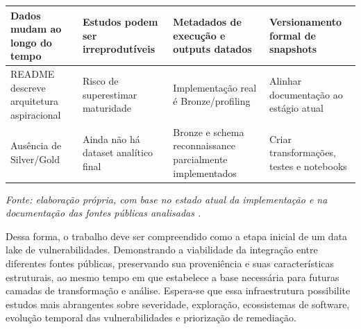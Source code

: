 \begin{table}[htbp]
{\begin{tabular}{|>{\raggedright\arraybackslash}p{3.0cm}|>{\raggedright\arraybackslash}p{3.1cm}|>{\raggedright\arraybackslash}p{3.7cm}|>{\raggedright\arraybackslash}p{3.2cm}|}
            \hline
            Dados mudam ao longo do tempo            & Estudos podem ser irreprodutíveis                          & Metadados de execução e outputs datados                   & Versionamento formal de snapshots                                                            \\
            \hline
            README descreve arquitetura aspiracional & Risco de superestimar maturidade                           & Implementação real é Bronze/profiling                     & Alinhar documentação ao estágio atual                                                        \\
            \hline
            Ausência de Silver/Gold                  & Ainda não há dataset analítico final                       & Bronze e schema reconnaissance parcialmente implementados & Criar transformações, testes e notebooks                                                     \\
            \hline
        \end{tabular}%
    }

    \vspace{0.2cm}
    \footnotesize
    \textit{Fonte: elaboração própria, com base no estado atual da implementação e na documentação das fontes públicas analisadas \cite{databricks_medallion_architecture,jiang_2021_data_inconsistency,allodi_massacci_2014_cvss_exploits,first_epss}.}

\end{table}

Dessa forma, o trabalho deve ser compreendido como a etapa inicial de um data lake de vulnerabilidades. Demonstrando a viabilidade da integração entre diferentes fontes públicas, preservando sua proveniência e suas características estruturais, ao mesmo tempo em que estabelece a base necessária para futuras camadas de transformação e análise. Espera-se que essa infraestrutura possibilite estudos mais abrangentes sobre severidade, exploração, ecossistemas de software, evolução temporal das vulnerabilidades e priorização de remediação.
